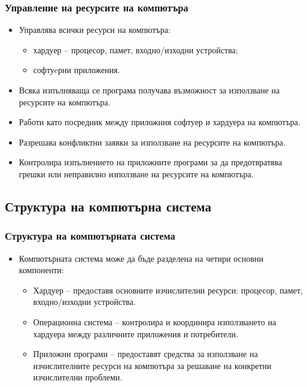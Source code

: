 \documentclass[ignorenonframetext, hyperref=unicode]{beamer}
\begin{document}
\begin{frame}\frametitle{Управление на ресурсите на компютъра}
\begin{itemize}
\item Управлява всички ресурси на компютъра:
\begin{itemize}
  \item хардуер -- процесор, памет, входно/изходни устройства; 
  \item софтуeрни приложения.
\end{itemize}
\item Всяка изпълняваща се програма получава възможност за използване на 
ресурсите на компютъра.
\item Работи като посредник между приложния софтуер и хардуера на компютъра.
\item Разрешава конфликтни заявки за използване на ресурсите на компютъра.
\item Контролира изпълнението на приложните програми за да предотвратява грешки
или неправилно използване на ресурсите на компютъра.
\end{itemize}
\end{frame}




\subsection{Структура на компютърна система}

\begin{frame}\frametitle{Структура на компютърната система}
\begin{itemize}
  \item Компютърната система може да бъде разделена на четири основни
  компоненти: 
\begin{itemize}
  \item Хардуер -- предоставя основните изчислителни ресурси: процесор, памет,
  входно/изходни устройства.
  \item Операционна система -- контролира и координира използването на хардуера между
  различните приложения и потребители.
  \item Приложни програми -- предоставят средства за използване на
  изчислителните ресурси на компютъра за решаване на конкретни изчислителни проблеми.
\end{itemize}

\end{itemize}

\end{frame}
\end{document}
